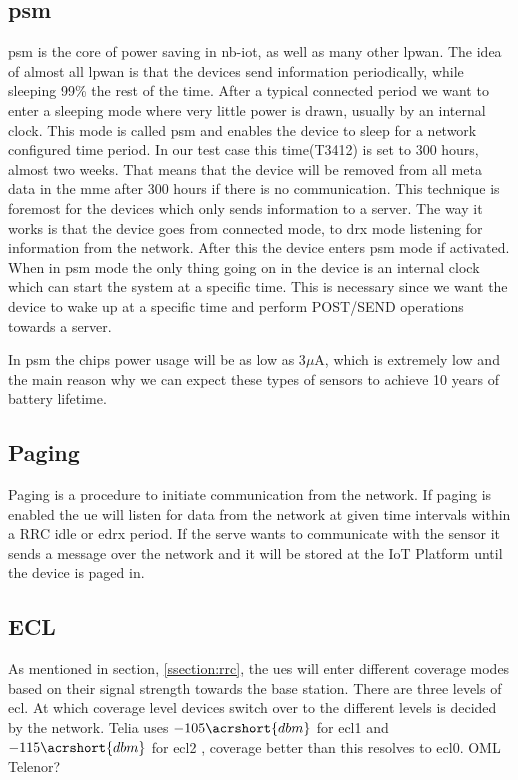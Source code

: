 \documentclass[USenglish]{ifimaster}  %
\begin{document}
\subsection{\acrfull{psm}} \label{ssection:psm}
\acrshort{psm} is the core of power saving in \acrshort{nb-iot}, as well as many other \acrshort{lpwan}. The idea of almost all \acrshort{lpwan} is that the devices send information periodically, while sleeping 99\% the rest of the time. After a typical connected period we want to enter a sleeping mode where very little power is drawn, usually by an internal clock. This mode is called \acrshort{psm} and enables the device to sleep for a network configured time period. In our test case this time(\acrfull{T3412}) is set to 300 hours, almost two weeks. That means that the device will be removed from all meta data in the \acrshort{mme} after 300 hours if there is no communication. This technique is foremost for the devices which only sends information to a server. The way it works is that the device goes from connected mode, to \acrshort{drx} mode listening for information from the network. After this the device enters \acrshort{psm} mode if activated. When in \acrshort{psm} mode the only thing going on in the device is an internal clock which can start the system at a specific time. This is necessary since we want the device to wake up at a specific time and perform POST/SEND operations towards a server.

In \acrshort{psm} the chips power usage will be as low as 3$\mu$A, which is extremely low and the main reason why we can expect these types of sensors to achieve 10 years of battery lifetime.

\subsection{Paging} \label{ssection:paging}
Paging is a procedure to initiate communication from the network. If paging is enabled the \acrshort{ue} will listen for data from the network at given time intervals within a RRC idle or \acrshort{edrx} period. If the serve wants to communicate with the sensor it sends a message over the network and it will be stored at the IoT Platform until the device is paged in.

\subsection{ECL} \label{ssection:ecl}
As mentioned in section, \vref{ssection:rrc}, the \acrshort{ue}s will enter different coverage modes based on their signal strength towards the base station. There are three levels of \acrfull{ecl}. At which coverage level devices switch over to the different levels is decided by the network. Telia uses ${-105 \acrshort{dbm}}$ for \acrshort{ecl}1 and ${-115 \acrshort{dbm}}$ for \acrshort{ecl}2 \cite{mail:teliaMailThread}, coverage better than this resolves to \acrshort{ecl}0. OML Telenor?
\end{document}

